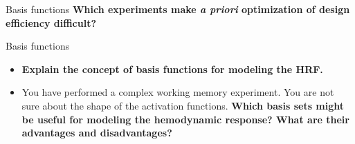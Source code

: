 \documentclass{beamer}
\begin{document}
\begin{frame}{Basis functions}
  \textbf{Which experiments make \textit{a priori} optimization of design efficiency difficult?}

\end{frame}

%

\begin{frame}{Basis functions}
  \begin{itemize}
    \item \textbf{Explain the concept of basis functions for modeling the HRF.}


    \bigskip
    \item You have performed a complex working memory experiment. You are not sure about the shape of the activation functions. \textbf{Which basis sets might be useful for modeling the hemodynamic response? What are their advantages and disadvantages?}

  \end{itemize}
\end{frame}
\end{document}
